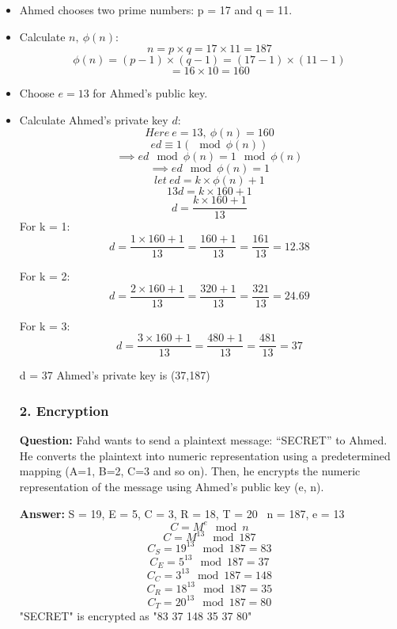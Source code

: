 \documentclass[a4paper]{article}
\begin{document}
\begin{itemize}
    \item Ahmed chooses two prime numbers: p = 17 and q = 11.
    \item Calculate \(n,\ \phi(n) \):
          \[ n = p \times q = 17 \times 11 = 187 \]
          \[\phi(n) = (p - 1) \times (q - 1) = (17 - 1) \times (11 - 1)\]
          \[ = 16 \times 10 = 160\]

    \item Choose \( e = 13 \) for Ahmed’s public key.

    \item Calculate Ahmed’s private key \( d \):
          \[
              Here \ e = 13, \ \phi(n) = 160
          \]
          \[
              ed \equiv 1 (\mod\phi(n))
          \]
          \[
              \implies ed \mod \phi(n) = 1\mod\phi(n)
          \]
          \[
              \implies ed\mod\phi(n) = 1
          \]
          \[
              let \ ed = k \times \phi(n) + 1
          \]
          \[
              13d = k \times 160 + 1
          \]
          \[
              d = \frac{k \times 160 + 1}{13}
          \]
          For k = 1:
          \[
              d = \frac{1 \times 160 + 1}{13} = \frac{160 + 1}{13} = \frac{161}{13} = 12.38
          \]

          For k = 2:
          \[
              d = \frac{2\times 160 + 1}{13} = \frac{320 + 1}{13} = \frac{321}{13} = 24.69
          \]

          For k = 3:
          \[
              d = \frac{3\times 160 + 1}{13} = \frac{480 + 1}{13} = \frac{481}{13} = 37
          \]

          d = 37 \newline Ahmed’s private key is (37,187) \subsubsection*{2. Encryption}
          \textbf{Question: }Fahd wants to send a plaintext message: “SECRET” to Ahmed.
          He converts the plaintext into numeric representation using a predetermined
          mapping (A=1, B=2, C=3 and so on). Then, he encrypts the numeric representation
          of the message using Ahmed’s public key (e, n). \newline

          \textbf{Answer: } S = 19, E =
          5, C = 3, R = 18, T = 20 \ n = 187, e = 13 \
          \[ C = M^e \mod n \]
          \[ C = M^{13} \mod 187\]
          \[C_S = 19^{13} \mod 187 = 83\]
          \[C_E = 5^{13} \mod 187 = 37\]
          \[C_C = 3^{13} \mod 187 = 148\]
          \[C_R = 18^{13} \mod 187 = 35\]
          \[C_T = 20^{13} \mod 187 = 80\]
          "SECRET" is encrypted as "83 37 148 35 37 80"


\end{itemize}
\end{document}
